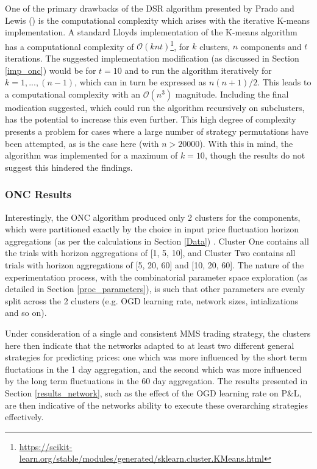 \documentclass[a4paper,11pt,oneside]{article}
\theoremstyle{plain}
\theoremstyle{definition}
\begin{document}
	One of the primary drawbacks of the DSR algorithm presented by Prado and Lewis (\cite{PradoDSR}) is the computational complexity which arises with the iterative K-means implementation. A standard Lloyds implementation of the K-means algorithm has a computational complexity of $\mathcal{O}(knt)$\footnote{\url{https://scikit-learn.org/stable/modules/generated/sklearn.cluster.KMeans.html}}, for $k$ clusters, $n$ components and $t$ iterations. The suggested implementation modification (as discussed in Section \ref{imp_onc}) would be for $t=10$ and to run the algorithm iteratively for $k=1,...,(n-1)$, which can in turn be expressed as $n(n+1)/2$. This leads to a computational complexity with an $\mathcal{O}(n^3)$ magnitude. Including the final modication suggested, which could run the algorithm recursively on subclusters, has the potential to increase this even further. This high degree of complexity presents a problem for cases where a large number of strategy permutations have been attempted, as is the case here (with $n> 20000$). With this in mind, the algorithm was implemented for a maximum of $k=10$, though the results do not suggest this hindered the findings.
	
	\subsubsection{ONC Results}\label{results_onc}
	
	Interestingly, the ONC algorithm produced only 2 clusters for the components, which were partitioned exactly by the choice in input price fluctuation horizon aggregations (as per the calculations in Section \ref{Data}) . Cluster One contains all the trials with horizon aggregations of [1, 5, 10], and Cluster Two contains all trials with horizon aggregations of [5, 20, 60] and [10, 20, 60]. The nature of the experimentation process, with the combinatorial parameter space exploration (as detailed in Section \ref{proc_parameters}), is such that other parameters are evenly split across the 2 clusters (e.g. OGD learning rate, network sizes, intializations and so on).\newline
	
	Under consideration of a single and consistent MMS trading strategy, the clusters here then indicate that the networks adapted to at least two different general strategies for predicting prices: one which was more influenced by the short term fluctations in the 1 day aggregation, and the second which was more influenced by the long term fluctuations in the 60 day aggregation. The results presented in Section \ref{results_network}, such as the effect of the OGD learning rate on P\&L, are then indicative of the networks ability to execute these overarching strategies effectively. \newline
	
\end{document}
